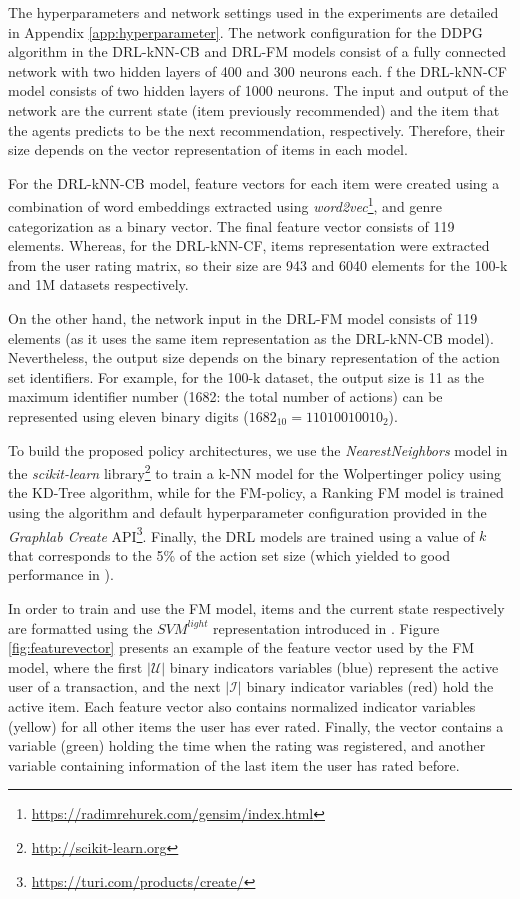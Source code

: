 The hyperparameters and network settings used in the experiments are detailed in Appendix \ref{app:hyperparameter}. The network configuration for the DDPG algorithm in the DRL-kNN-CB and DRL-FM models consist of a fully connected network with two hidden layers of 400 and 300 neurons each. f the DRL-kNN-CF model consists of two hidden layers of 1000 neurons. The input and output of the network are the current state (item previously recommended) and the item that the agents predicts to be the next recommendation, respectively. Therefore, their size depends on the vector representation of items in each model.

For the DRL-kNN-CB model, feature vectors for each item were created using a combination of word embeddings extracted using \textit{word2vec}\footnote{\url{https://radimrehurek.com/gensim/index.html}}, and genre categorization as a binary vector. The final feature vector consists of 119 elements. Whereas, for the DRL-kNN-CF, items representation were extracted from the user rating matrix, so their size are 943 and 6040 elements for the 100-k and 1M datasets respectively.

On the other hand, the network input in the DRL-FM model consists of 119 elements (as it uses the same item representation as the DRL-kNN-CB model). Nevertheless, the output size depends on the binary representation of the action set identifiers. For example, for the 100-k dataset, the output size is 11 as the maximum identifier number (1682: the total number of actions) can be represented using eleven binary digits ($1682_{10} = 11010010010_2$).

To build the proposed policy architectures, we use the \textit{NearestNeighbors} model in the \textit{scikit-learn} library\footnote{\url{http://scikit-learn.org}} to train a k-NN model for the Wolpertinger policy using the KD-Tree algorithm, while for the FM-policy, a Ranking FM model is  trained using the algorithm and default hyperparameter configuration provided in the \textit{Graphlab Create} API\footnote{\url{https://turi.com/products/create/}}. Finally, the DRL models are trained using a value of $k$ that corresponds to the 5\% of the action set size (which yielded to good performance in \cite{Dulac-Arnold2015}).

In order to train and use the FM model, items and the current state respectively are formatted using the $SVM^{light}$ representation introduced in \cite{joachims1999making}. Figure \ref{fig:featurevector} presents an example of the feature vector used by the FM model, where the first $|\mathcal{U}|$ binary indicators variables (blue) represent the active user of a transaction, and the next $|\mathcal{I}|$ binary indicator variables (red) hold the active item. Each feature vector also contains normalized indicator variables (yellow) for all other items the user has ever rated. Finally, the vector contains a variable (green) holding the time when the rating was registered, and another variable containing information of the last item the user has rated before.

